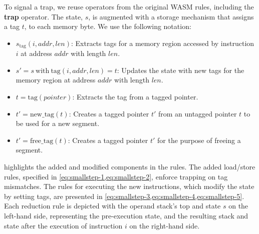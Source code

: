 To signal a trap, we reuse operators from the original WASM rules, including the \textbf{trap} operator.
The state, $s$, is augmented with a storage mechanism that assigns a tag $t$, to each memory byte.
We use the following notation:

\begin{itemize}
    \item $s_{\text{tag}}(i, \mathit{addr}, \mathit{len})$: Extracts tags for a memory region accessed by instruction $i$ at address $\mathit{addr}$ with length $\mathit{len}$.
    \item $s' = s\ \text{with}\ \text{tag}(i, \mathit{addr}, \mathit{len}) = t$: Updates the state with new tags for the memory region at address $\mathit{addr}$ with length $\mathit{len}$.
    \item $t = \text{tag}(\mathit{pointer})$: Extracts the tag from a tagged pointer.
    \item $t' = \text{new\_tag}(t)$: Creates a tagged pointer $t'$ from an untagged pointer $t$ to be used for a new segment.
    \item $t' = \text{free\_tag}(t)$: Creates a tagged pointer $t'$ for the purpose of freeing a segment.
\end{itemize}

\noindent
{} highlights the added and modified components in the rules.
The added load/store rules, specified in \cref{eq:smallstep-1,eq:smallstep-2}, enforce trapping on tag mismatches.
The rules for executing the new instructions, which modify the state by setting tags, are presented in \cref{eq:smallstep-3,eq:smallstep-4,eq:smallstep-5}.
Each reduction rule is depicted with the operand stack's top and state $s$ on the left-hand side, representing the pre-execution state, and the resulting stack and state after the execution of instruction $i$ on the right-hand side.

